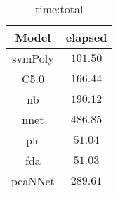 \begin{table}[!ht]
	\centering
	\begin{tabular}{|c|c|}
		\hline
		Model & elapsed \\ \hline
		svmPoly & $101.50$ \\ \hline
		C5.0 & $166.44$ \\ \hline
		nb & $190.12$ \\ \hline
		nnet & $486.85$ \\ \hline
		pls & $51.04$ \\ \hline
		fda & $51.03$ \\ \hline
		pcaNNet & $289.61$ \\ \hline
	\end{tabular}
	\caption{time:total}
	\label{tab:time:total}
\end{table}
